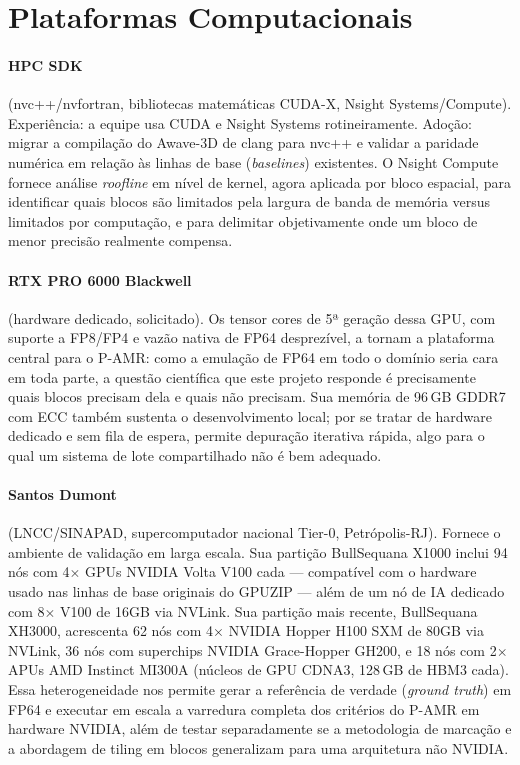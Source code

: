 \documentclass[12pt,a4paper]{article}
\newcommand{\pamr}{P\nobreakdash-AMR}
\begin{document}
\section{Plataformas Computacionais}

\paragraph{HPC SDK} (nvc++/nvfortran, bibliotecas matemáticas CUDA-X, Nsight
Systems/Compute). Experiência: a equipe usa CUDA e Nsight Systems
rotineiramente. Adoção: migrar a compilação do Awave-3D de clang para nvc++ e
validar a paridade numérica em relação às linhas de base (\emph{baselines})
existentes. O Nsight Compute fornece análise \emph{roofline} em nível de
kernel, agora aplicada por bloco espacial, para identificar quais blocos são
limitados pela largura de banda de memória versus limitados por computação, e
para delimitar objetivamente onde um bloco de menor precisão realmente
compensa.

\paragraph{RTX PRO 6000 Blackwell} (hardware dedicado, solicitado). Os tensor
cores de 5ª geração dessa GPU, com suporte a FP8/FP4 e vazão nativa de FP64
desprezível, a tornam a plataforma central para o \pamr{}: como a emulação de
FP64 em todo o domínio seria cara em toda parte, a questão científica que este
projeto responde é precisamente quais blocos precisam dela e quais não
precisam. Sua memória de 96\,GB GDDR7 com ECC também sustenta o
desenvolvimento local; por se tratar de hardware dedicado e sem fila de
espera, permite depuração iterativa rápida, algo para o qual um sistema de
lote compartilhado não é bem adequado.

\paragraph{Santos Dumont} (LNCC/SINAPAD, supercomputador nacional Tier-0,
Petrópolis-RJ). Fornece o ambiente de validação em larga escala. Sua partição
BullSequana X1000 inclui 94 nós com 4$\times$ GPUs NVIDIA Volta V100 cada ---
compatível com o hardware usado nas linhas de base originais do GPUZIP ---
além de um nó de IA dedicado com 8$\times$ V100 de 16GB via NVLink. Sua
partição mais recente, BullSequana XH3000, acrescenta 62 nós com 4$\times$
NVIDIA Hopper H100 SXM de 80GB via NVLink, 36 nós com superchips NVIDIA
Grace-Hopper GH200, e 18 nós com 2$\times$ APUs AMD Instinct MI300A (núcleos
de GPU CDNA3, 128\,GB de HBM3 cada). Essa heterogeneidade nos permite gerar a
referência de verdade (\emph{ground truth}) em FP64 e executar em escala a
varredura completa dos critérios do \pamr{} em hardware NVIDIA, além de testar
separadamente se a metodologia de marcação e a abordagem de tiling em blocos
generalizam para uma arquitetura não NVIDIA.
\end{document}
